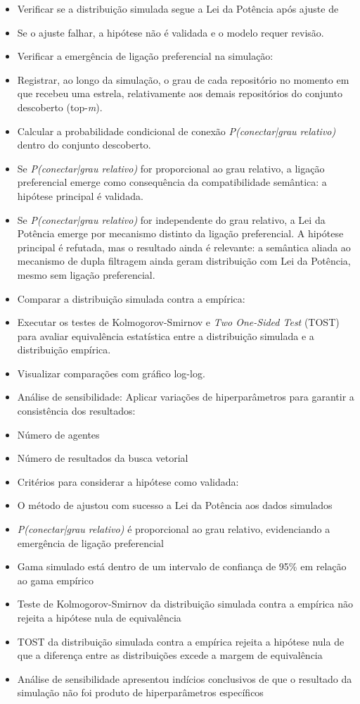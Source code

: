 \documentclass[12pt,oneside,a4paper,brazil,sumario=tradicional]{abntex2}
\begin{document}
\begin{itemize}
  \item Verificar se a distribuição simulada segue a Lei da Potência após ajuste de 
  \item Se o ajuste falhar, a hipótese não é validada e o modelo requer revisão.
  \item Verificar a emergência de ligação preferencial na simulação:
  \item Registrar, ao longo da simulação, o grau de cada repositório no momento em que recebeu uma estrela, relativamente aos demais repositórios do conjunto descoberto (top-\textit{m}).
  \item Calcular a probabilidade condicional de conexão \textit{P(conectar|grau relativo)} dentro do conjunto descoberto.
  \item Se \textit{P(conectar|grau relativo)} for proporcional ao grau relativo, a ligação preferencial emerge como consequência da compatibilidade semântica: a hipótese principal é validada.
  \item Se \textit{P(conectar|grau relativo)} for independente do grau relativo, a Lei da Potência emerge por mecanismo distinto da ligação preferencial. A hipótese principal é refutada, mas o resultado ainda é relevante: a semântica aliada ao mecanismo de dupla filtragem ainda geram distribuição com Lei da Potência, mesmo sem ligação preferencial.
  \item Comparar a distribuição simulada contra a empírica:
  \item Executar os testes de Kolmogorov-Smirnov e \textit{Two One-Sided Test }(TOST) para avaliar equivalência estatística entre a distribuição simulada e a distribuição empírica.
  \item Visualizar comparações com gráfico log-log.
  \item Análise de sensibilidade: Aplicar variações de hiperparâmetros para garantir a consistência dos resultados:
  \item Número de agentes
  \item Número de resultados da busca vetorial
  \item Critérios para considerar a hipótese como validada:
  \item O método de  ajustou com sucesso a Lei da Potência aos dados simulados
  \item \textit{P(conectar|grau relativo)} é proporcional ao grau relativo, evidenciando a emergência de ligação preferencial
  \item Gama simulado está dentro de um intervalo de confiança de 95\% em relação ao gama empírico
  \item Teste de Kolmogorov-Smirnov da distribuição simulada contra a empírica não rejeita a hipótese nula de equivalência
  \item TOST da distribuição simulada contra a empírica rejeita a hipótese nula de que a diferença entre as distribuições excede a margem de equivalência
  \item Análise de sensibilidade apresentou indícios conclusivos de que o resultado da simulação não foi produto de hiperparâmetros específicos
\end{itemize}


\postextual
\end{document}
